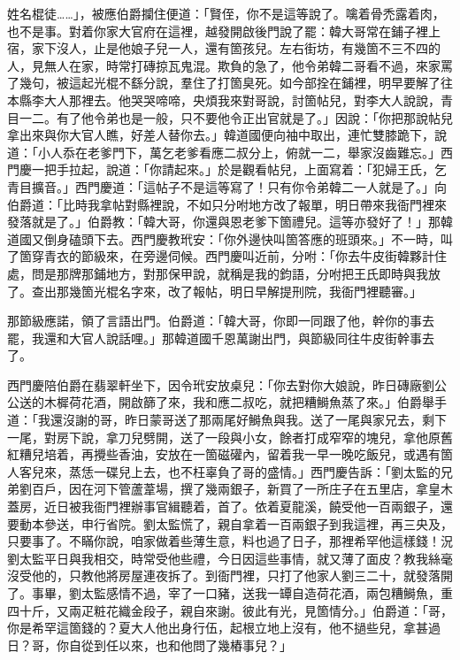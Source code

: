 姓名棍徒……」，被應伯爵攔住便道：「賢侄，你不是這等說了。噙着骨禿露着肉，也不是事。對着你家大官府在這裡，越發開啟後門說了罷：{}韓大哥常在鋪子裡上宿，家下沒人，止是他娘子兒一人，還有箇孩兒。左右街坊，有幾箇不三不四的人，見無人在家，時常打磚掠瓦鬼混。欺負的急了，他令弟韓二哥看不過，來家罵了幾句，被這起光棍不繇分說，羣住了打箇臭死。如今部拴在鋪裡，明早要解了往本縣李大人那裡去。他哭哭啼啼，央煩我來對哥說，討箇帖兒，對李大人說說，青目一二。有了他令弟也是一般，只不要他令正出官就是了。」因說：「你把那說帖兒拿出來與你大官人瞧，好差人替你去。」韓道國便向袖中取出，連忙雙膝跪下，說道：「小人忝在老爹門下，萬乞老爹看應二叔分上，俯就一二，舉家沒齒難忘。」西門慶一把手拉起，說道：「你請起來。」於是觀看帖兒，上面寫着：「犯婦王氏，乞青目擴音。」西門慶道：「這帖子不是這等寫了！只有你令弟韓二一人就是了。」向伯爵道：「比時我拿帖對縣裡說，不如只分咐地方改了報單，明日帶來我衙門裡來發落就是了。」{}伯爵教：「韓大哥，你還與恩老爹下箇禮兒。這等亦發好了！」那韓道國又倒身磕頭下去。西門慶教玳安：「你外邊快叫箇答應的班頭來。」不一時，叫了箇穿青衣的節級來，在旁邊伺候。西門慶叫近前，分咐：「你去牛皮街韓夥計住處，問是那牌那鋪地方，對那保甲說，就稱是我的鈞語，分咐把王氏即時與我放了。查出那幾箇光棍名字來，改了報帖，明日早解提刑院，我衙門裡聽審。」

那節級應諾，領了言語出門。伯爵道：「韓大哥，你即一同跟了他，幹你的事去罷，我還和大官人說話哩。」那韓道國千恩萬謝出門，與節級同往牛皮街幹事去了。

西門慶陪伯爵在翡翠軒坐下，因令玳安放桌兒：「你去對你大娘說，昨日磚廠劉公公送的木樨荷花酒，開啟篩了來，我和應二叔吃，就把糟鰣魚蒸了來。」伯爵舉手道：「我還沒謝的哥，昨日蒙哥送了那兩尾好鰣魚與我。送了一尾與家兄去，剩下一尾，對房下說，拿刀兒劈開，送了一段與小女，餘者打成窄窄的塊兒，拿他原舊紅糟兒培着，再攪些香油，安放在一箇磁礶內，留着我一早一晚吃飯兒，或遇有箇人客兒來，蒸恁一碟兒上去，也不枉辜負了哥的盛情。」西門慶告訴：「劉太監的兄弟劉百戶，因在河下管蘆葦場，撰了幾兩銀子，新買了一所庄子在五里店，拿皇木蓋房，近日被我衙門裡辦事官緝聽着，首了。依着夏龍溪，饒受他一百兩銀子，還要動本參送，申行省院。劉太監慌了，親自拿着一百兩銀子到我這裡，再三央及，只要事了。不瞞你說，咱家做着些薄生意，料也過了日子，那裡希罕他這樣錢！況劉太監平日與我相交，時常受他些禮，今日因這些事情，就又薄了面皮？{}教我絲毫沒受他的，只教他將房屋連夜拆了。到衙門裡，只打了他家人劉三二十，就發落開了。事畢，劉太監感情不過，宰了一口豬，送我一罈自造荷花酒，兩包糟鰣魚，重四十斤，又兩疋粧花織金段子，親自來謝。彼此有光，見箇情分。」伯爵道：「哥，你是希罕這箇錢的？夏大人他出身行伍，起根立地上沒有，他不撾些兒，拿甚過日？哥，你自從到任以來，也和他問了幾樁事兒？」


